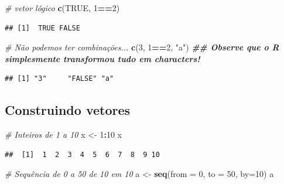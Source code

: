 \documentclass[
]{book}
\newenvironment{Shaded}{\begin{snugshade}}{\end{snugshade}}
\newcommand{\AttributeTok}[1]{\textcolor[rgb]{0.13,0.29,0.53}{#1}}
\newcommand{\CommentTok}[1]{\textcolor[rgb]{0.56,0.35,0.01}{\textit{#1}}}
\newcommand{\ConstantTok}[1]{\textcolor[rgb]{0.56,0.35,0.01}{#1}}
\newcommand{\DecValTok}[1]{\textcolor[rgb]{0.00,0.00,0.81}{#1}}
\newcommand{\DocumentationTok}[1]{\textcolor[rgb]{0.56,0.35,0.01}{\textbf{\textit{#1}}}}
\newcommand{\FunctionTok}[1]{\textcolor[rgb]{0.13,0.29,0.53}{\textbf{#1}}}
\newcommand{\NormalTok}[1]{#1}
\newcommand{\OtherTok}[1]{\textcolor[rgb]{0.56,0.35,0.01}{#1}}
\newcommand{\SpecialCharTok}[1]{\textcolor[rgb]{0.81,0.36,0.00}{\textbf{#1}}}
\newcommand{\StringTok}[1]{\textcolor[rgb]{0.31,0.60,0.02}{#1}}
\begin{document}
\begin{Shaded}
\begin{Highlighting}[]
\CommentTok{\# vetor lógico}
\FunctionTok{c}\NormalTok{(}\ConstantTok{TRUE}\NormalTok{, }\DecValTok{1}\SpecialCharTok{==}\DecValTok{2}\NormalTok{)}
\end{Highlighting}
\end{Shaded}

\begin{verbatim}
## [1]  TRUE FALSE
\end{verbatim}

\begin{Shaded}
\begin{Highlighting}[]
\CommentTok{\# Não podemos ter combinações...}
\FunctionTok{c}\NormalTok{(}\DecValTok{3}\NormalTok{, }\DecValTok{1}\SpecialCharTok{==}\DecValTok{2}\NormalTok{, }\StringTok{"a"}\NormalTok{) }\DocumentationTok{\#\# Observe que o R simplesmente transformou tudo em characters!}
\end{Highlighting}
\end{Shaded}

\begin{verbatim}
## [1] "3"     "FALSE" "a"
\end{verbatim}

\subsection{Construindo vetores}\label{construindo-vetores}

\begin{Shaded}
\begin{Highlighting}[]
\CommentTok{\# Inteiros de 1 a 10}
\NormalTok{x }\OtherTok{\textless{}{-}} \DecValTok{1}\SpecialCharTok{:}\DecValTok{10}
\NormalTok{x}
\end{Highlighting}
\end{Shaded}

\begin{verbatim}
##  [1]  1  2  3  4  5  6  7  8  9 10
\end{verbatim}

\begin{Shaded}
\begin{Highlighting}[]
\CommentTok{\# Sequência de 0 a 50 de 10 em 10}
\NormalTok{a }\OtherTok{\textless{}{-}} \FunctionTok{seq}\NormalTok{(}\AttributeTok{from =} \DecValTok{0}\NormalTok{, }\AttributeTok{to =} \DecValTok{50}\NormalTok{, }\AttributeTok{by=}\DecValTok{10}\NormalTok{)}
\NormalTok{a}
\end{Highlighting}
\end{Shaded}
\end{document}
